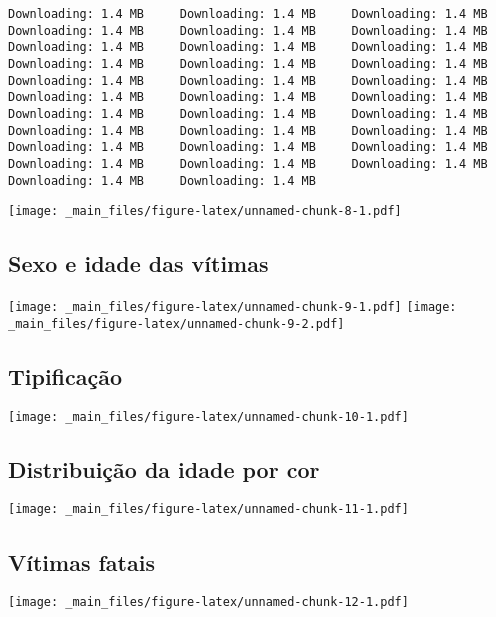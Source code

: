 \documentclass[
  12pt,
]{report}
\begin{document}
\begin{verbatim}
Downloading: 1.4 MB     Downloading: 1.4 MB     Downloading: 1.4 MB     Downloading: 1.4 MB     Downloading: 1.4 MB     Downloading: 1.4 MB     Downloading: 1.4 MB     Downloading: 1.4 MB     Downloading: 1.4 MB     Downloading: 1.4 MB     Downloading: 1.4 MB     Downloading: 1.4 MB     Downloading: 1.4 MB     Downloading: 1.4 MB     Downloading: 1.4 MB     Downloading: 1.4 MB     Downloading: 1.4 MB     Downloading: 1.4 MB     Downloading: 1.4 MB     Downloading: 1.4 MB     Downloading: 1.4 MB     Downloading: 1.4 MB     Downloading: 1.4 MB     Downloading: 1.4 MB     Downloading: 1.4 MB     Downloading: 1.4 MB     Downloading: 1.4 MB     Downloading: 1.4 MB     Downloading: 1.4 MB     Downloading: 1.4 MB     Downloading: 1.4 MB     Downloading: 1.4 MB
\end{verbatim}

\texttt{[image: \_main\_files/figure-latex/unnamed-chunk-8-1.pdf]}

\hypertarget{sexo-e-idade-das-vuxedtimas}{%
\subsection{Sexo e idade das vítimas}\label{sexo-e-idade-das-vuxedtimas}}

\texttt{[image: \_main\_files/figure-latex/unnamed-chunk-9-1.pdf]} \texttt{[image: \_main\_files/figure-latex/unnamed-chunk-9-2.pdf]}

\hypertarget{tipificauxe7uxe3o}{%
\subsection{Tipificação}\label{tipificauxe7uxe3o}}

\texttt{[image: \_main\_files/figure-latex/unnamed-chunk-10-1.pdf]}

\hypertarget{distribuiuxe7uxe3o-da-idade-por-cor}{%
\subsection{Distribuição da idade por cor}\label{distribuiuxe7uxe3o-da-idade-por-cor}}

\texttt{[image: \_main\_files/figure-latex/unnamed-chunk-11-1.pdf]}

\hypertarget{vuxedtimas-fatais}{%
\subsection{Vítimas fatais}\label{vuxedtimas-fatais}}

\texttt{[image: \_main\_files/figure-latex/unnamed-chunk-12-1.pdf]}
\end{document}
